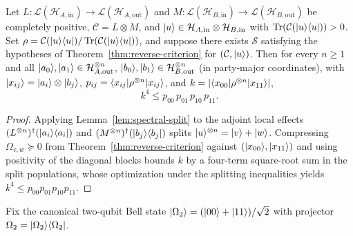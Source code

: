 \begin{lemma}
\label{lem:coherence-general}
\leanok
{}
Let $L : \mathcal{L}(\mathcal{H}_{A,\mathrm{in}}) \to \mathcal{L}(\mathcal{H}_{A,\mathrm{out}})$ and $M : \mathcal{L}(\mathcal{H}_{B,\mathrm{in}}) \to \mathcal{L}(\mathcal{H}_{B,\mathrm{out}})$ be completely positive, $\mathcal{C} = L\otimes M$, and $|u\rangle\in\mathcal{H}_{A,\mathrm{in}}\otimes\mathcal{H}_{B,\mathrm{in}}$ with $\operatorname{Tr}(\mathcal{C}(|u\rangle\langle u|)) > 0$. Set $\rho = \mathcal{C}(|u\rangle\langle u|) / \operatorname{Tr}(\mathcal{C}(|u\rangle\langle u|))$, and suppose there exists $\mathcal{S}$ satisfying the hypotheses of Theorem~\ref{thm:reverse-criterion} for $(\mathcal{C}, |u\rangle)$. Then for every $n\ge 1$ and all $|a_0\rangle,|a_1\rangle\in\mathcal{H}_{A,\mathrm{out}}^{\otimes n}$, $|b_0\rangle,|b_1\rangle\in\mathcal{H}_{B,\mathrm{out}}^{\otimes n}$ (in party-major coordinates), with $|x_{ij}\rangle = |a_i\rangle\otimes|b_j\rangle$, $p_{ij} = \langle x_{ij}|\rho^{\otimes n}|x_{ij}\rangle$, and $k = |\langle x_{00}|\rho^{\otimes n}|x_{11}\rangle|$,
\[
  k^4 \le p_{00}\,p_{01}\,p_{10}\,p_{11}.
\]
\end{lemma}
\begin{proof}
\leanok
Applying Lemma~\ref{lem:spectral-split} to the adjoint local effects $(L^{\otimes n})^{\dagger}(|a_i\rangle\langle a_i|)$ and $(M^{\otimes n})^{\dagger}(|b_j\rangle\langle b_j|)$ splits $|u\rangle^{\otimes n} = |v\rangle + |w\rangle$. Compressing $\Omega_{v,w}\succeq 0$ from Theorem~\ref{thm:reverse-criterion} against $(|x_{00}\rangle, |x_{11}\rangle)$ and using positivity of the diagonal blocks bounds $k$ by a four-term square-root sum in the split populations, whose optimization under the splitting inequalities yields $k^4 \le p_{00}p_{01}p_{10}p_{11}$.
\end{proof}

Fix the canonical two-qubit Bell state $|\Omega_2\rangle = (|00\rangle+|11\rangle)/\sqrt{2}$ with projector $\Omega_2 = |\Omega_2\rangle\langle \Omega_2|$.

